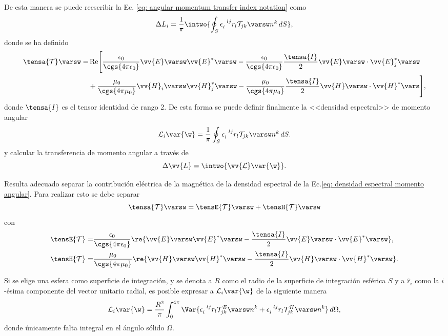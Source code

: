 De esta manera se puede reescribir la Ec. \eqref{eq: angular momentum transfer index notation} como
\begin{equation}
\Delta L_i = \frac{1}{\pi} \intwo{\oint_S \epsilon_{i}^{\,\,\,\, lj} r_l \mathcal{T}_{jk}\varsw n^k\,dS},
\label{eq: angular momentum transfer index notation freq domain}
\end{equation}
donde se ha definido 
\begin{align}
\tensa{\mathcal{T}}\varsw =& \,{\rm Re}\Bigg[\frac{\epsilon_0}{\cgs{4\pi\epsilon_0}} \vv{E} \varsw \vv{E}^{*}\varsw-\frac{\epsilon_0}{\cgs{4\pi\epsilon_0}} \frac{\tensa{I}}{2} \vv{E} \varsw\cdot\vv{E}_j^{*}\varsw \nonumber \\
& + \frac{\mu_0}{\cgs{4\pi\mu_0}} \vv{H}_i \varsw \vv{H}_j^{*}\varsw- \frac{\mu_0}{\cgs{4\pi\mu_0}} \frac{\tensa{I}}{2}  \vv{H} \varsw\cdot\vv{H}^{*}\vars \Bigg],
\end{align}
donde $\tensa{I}$ es el tensor identidad de rango 2. De esta forma se puede definir finalmente la <<densidad espectral>> de momento angular 
\begin{equation}
\mathcal{L}_i\var{\w} = \frac{1}{\pi} \oint_S \epsilon_{i}^{\,\,\,\, lj} r_l \mathcal{T}_{jk}\varsw n^k\,dS.
\end{equation}
y calcular la transferencia de momento angular a través de 
\begin{equation}
\Delta \vv{L} = \intwo{\vv{\mathcal{L}}\var{\w}}.
\label{eq: densidad espectral momento angular}
\end{equation}

Resulta adecuado separar la contribución eléctrica de la magnética de la densidad espectral de la Ec.\eqref{eq: densidad espectral momento angular}. Para realizar esto se debe separar
\begin{equation}
\tensa{\mathcal{T}}\varsw = \tensE{\mathcal{T}}\varsw +\tensH{\mathcal{T}}\varsw 
\end{equation}
con 
\begin{align}
\tensE{\mathcal{T}}=& \frac{\epsilon_0}{\cgs{4\pi\epsilon_0}} \re{\vv{E}\varsw \vv{E}^{*}\varsw - \frac{\tensa{I}}{2} \vv{E}\varsw\cdot\vv{E}^{*}\varsw},\\
\tensH{\mathcal{T}}=& \frac{\mu_0}{\cgs{4\pi\mu_0}} \re{\vv{H}\varsw \vv{H}^{*}\varsw - \frac{\tensa{I}}{2} \vv{H}\varsw\cdot\vv{H}^{*}\varsw}.
\end{align}

Si se elige una esfera como superficie de integración, y se denota a $R$ como el radio de la superficie de integración esférica $S$ y a $\hat{r}_i$ como la $i$-ésima componente del vector unitario radial, es posible expresar a $\mathcal{L}_i \var{\w}$ de la siguiente manera
\begin{equation}
\mathcal{L}_i\var{\w} = \frac{R^2}{\pi} \int_0^{4\pi} \Var{\epsilon_{i}^{\,\,\,\, lj} r_l \mathcal{T}^{E}_{jk}\varsw n^k + \epsilon_{i}^{\,\,\,\, lj} r_l \mathcal{T}^{H}_{jk}\varsw n^k}\,d\Omega,
\end{equation}
donde únicamente falta integral en el ángulo sólido $\Omega$.

